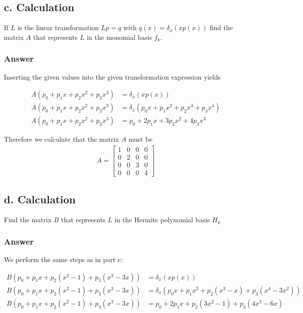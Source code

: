 \documentclass{article}
\begin{document}
		\subsection{c. Calculation}
		
		If $L$ is the linear transformation $Lp=q$ with $q(x)=\delta_{x}(xp(x))$ find the matrix $A$ that represents $L$ in the monomial basis $f_{k}$.
		
		\subsubsection{Answer}
		
		Inserting the given values into the given transformation expression yields
		
		\begin{align*}
			A(p_{0}+p_{1}x+p_{2}x^{2}+p_{3}x^{3})&=\delta_{x}(xp(x))\\
			A(p_{0}+p_{1}x+p_{2}x^{2}+p_{3}x^{3})&=\delta_{x}(p_{0}x+p_{1}x^2+p_{2}x^{3}+p_{3}x^{4})\\
			A(p_{0}+p_{1}x+p_{2}x^{2}+p_{3}x^{3})&=p_{0}+2p_{1}x+3p_{2}x^2+4p_{3}x^{3}
		\end{align*}
		
		Therefore we calculate that the matrix $A$ must be 
		\begin{align*}
		A=
		\begin{bmatrix}
			1 & 0 & 0 & 0\\
			0 & 2 & 0 & 0\\
			0 & 0 & 3 & 0\\
			0 & 0 & 0 & 4
		\end{bmatrix}
		\end{align*}
		\subsection{d. Calculation}
		
		Find the matrix $B$ that represents $L$ in the Hermite polynomial basis $H_{k}$
				
		\subsubsection{Answer}
		We perform the same steps as in part c:
		
		\begin{align*}
		B(p_{0}+p_{1}x+p_{2}(x^{2}-1)+p_{3}(x^{3}-3x))&=\delta_{x}(xp(x))\\
		B(p_{0}+p_{1}x+p_{2}(x^{2}-1)+p_{3}(x^{3}-3x))&=\delta_{x}(p_{0}x+p_{1}x^2+p_{2}(x^{3}-x)+p_{3}(x^{4}-3x^2))\\
		B(p_{0}+p_{1}x+p_{2}(x^{2}-1)+p_{3}(x^{3}-3x))&=p_{0}+2p_{1}x+p_{2}(3x^2-1)+p_{3}(4x^{3}-6x)
		\end{align*}
		
\end{document}

